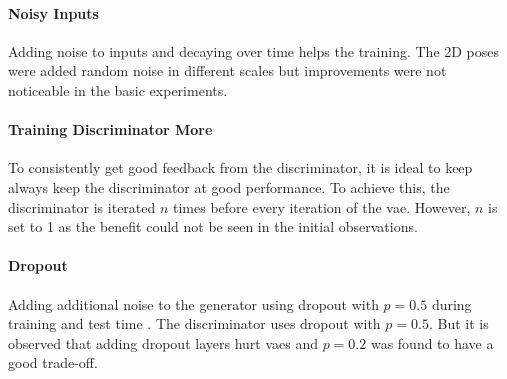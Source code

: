 \paragraph{Noisy Inputs}
Adding noise to inputs and decaying over time helps the training. The 2D poses were added random noise in different scales but improvements were not noticeable in the basic experiments. 

\paragraph{Training Discriminator More}
To consistently get good feedback from the discriminator, it is ideal to keep always keep the discriminator at good performance. To achieve this, the discriminator is iterated $n$ times before every iteration of the \ac{vae}. However, $n$ is set to 1 as the benefit could not be seen in the initial observations.

\paragraph{Dropout}
Adding additional noise to the generator using dropout with $p=0.5$ during training and test time \cite{gan_dropout}. The discriminator uses dropout with $p=0.5$. But it is observed that adding dropout layers hurt \acp{vae} and $p=0.2$ was found to have a good trade-off. 




